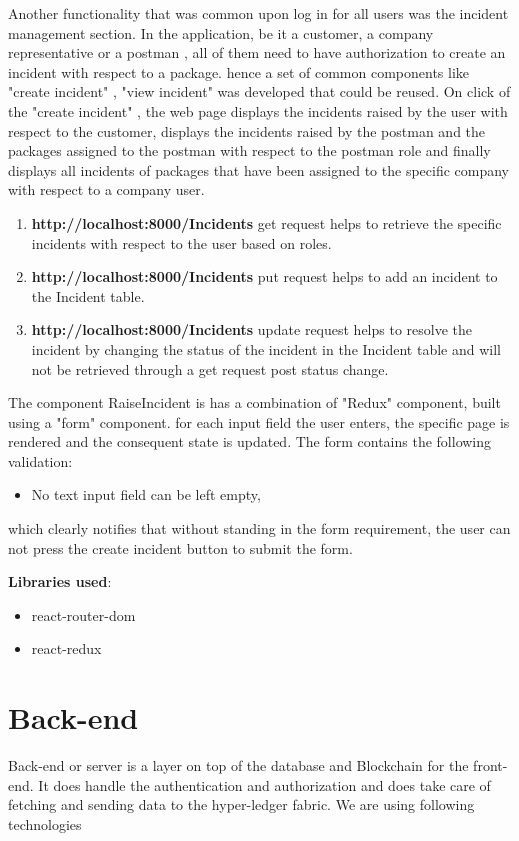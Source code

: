 Another functionality that was common upon log in for all users was the incident management section. In the application, be it a customer, a company representative or a postman , all of them need to have authorization to create an incident with respect to a package. hence a set of common components like "create incident" , "view incident" was developed that could be reused.
On click of the "create incident" , the web page displays the incidents raised by the user with respect to the customer,  displays the incidents raised by the postman and the packages assigned to the postman with respect to the postman role and finally displays all incidents of packages that have been assigned to the specific company with respect to a company user.

\begin{enumerate}
  \item \textbf{http://localhost:8000/Incidents}  get request helps to retrieve the specific incidents with respect to the user based on roles.
  \item \textbf{http://localhost:8000/Incidents} put request helps to add an incident to the Incident table.
  \item \textbf{http://localhost:8000/Incidents} update request helps to resolve the incident by changing the status of the incident in the Incident table and will not be retrieved through a get request post status change.
\end{enumerate}

The component RaiseIncident is has a combination of "Redux" component, built using a "form" component.
for each input field the user enters, the specific page is rendered and the consequent state is updated.
The form contains the following validation:
\begin{itemize}
\item No text input field can be left empty,
\end{itemize}
which clearly notifies that without standing in the form requirement, the user can not press the create incident button to submit the form.

\textbf{Libraries used}:
\begin{itemize}
    \item react-router-dom
    \item react-redux
\end{itemize}


\section{Back-end}
Back-end or server is a layer on top of the database and Blockchain for the front-end. It does handle the authentication and authorization and does take care of fetching and sending data to the hyper-ledger fabric. We are using following technologies 


